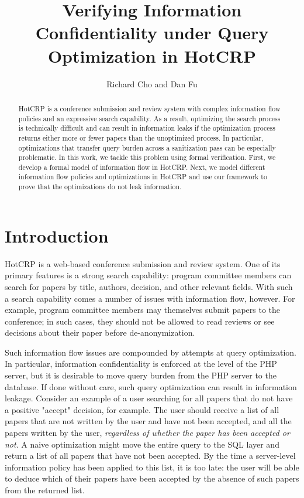 \documentclass[11pt,journal]{IEEEtran}
\title{Verifying Information Confidentiality under Query Optimization in HotCRP}
\author{Richard Cho and Dan Fu}
\begin{document}
\maketitle

\begin{abstract}
    HotCRP is a conference submission and review system with complex information flow policies and an expressive search capability.  As a result, optimizing the search process is technically difficult and can result in information leaks if the optimization process returns either more or fewer papers than the unoptimized process.  In particular, optimizations that transfer query burden across a sanitization pass can be especially problematic.  In this work, we tackle this problem using formal verification.  First, we develop a formal model of information flow in HotCRP.  Next, we model different information flow policies and optimizations in HotCRP and use our framework to prove that the optimizations do not leak information.
\end{abstract}

\section{Introduction}
HotCRP is a web-based conference submission and review system\cite{hotcrp, hotcrppaper}.  One of its primary features is a strong search capability: program committee members can search for papers by title, authors, decision, and other relevant fields.  With such a search capability comes a number of issues with information flow, however.  For example, program committee members may themselves submit papers to the conference; in such cases, they should not be allowed to read reviews or see decisions about their paper before de-anonymization.

Such information flow issues are compounded by attempts at query optimization.  In particular, information confidentiality is enforced at the level of the PHP server, but it is desirable to move query burden from the PHP server to the database.  If done without care, such query optimization can result in information leakage.  Consider an example of a user searching for all papers that do not have a positive "accept" decision, for example.  The user should receive a list of all papers that are not written by the user and have not been accepted, and all the papers written by the user, \textit{regardless of whether the paper has been accepted or not}.  A naive optimization might move the entire query to the SQL layer and return a list of all papers that have not been accepted.  By the time a server-level information policy has been applied to this list, it is too late: the user will be able to deduce which of their papers have been accepted by the absence of such papers from the returned list.
\end{document}
